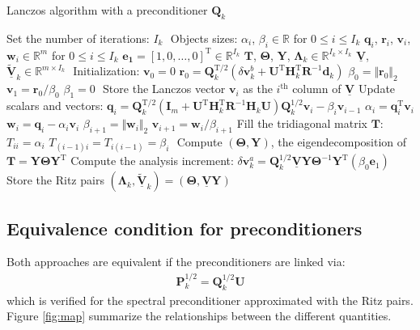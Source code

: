 \documentclass[12pt]{scrartcl}
\begin{document}
\begin{algorithm}[!ht]
\caption{Lanczos algorithm with a preconditioner $\mathbf{Q}_k$\label{algo:lanczos}}
\begin{algorithmic}
\STATE Set the number of iterations: $I_k$
\STATE $  $
\STATE Objects sizes:
\STATE $\alpha_i$, $\beta_i \in \mathbb{R}$ for $0 \le i \le I_k$
\STATE $\mathbf{q}_i$, $\mathbf{r}_i$, $\mathbf{v}_i$, $\mathbf{w}_i \in \mathbb{R}^m$ for $0 \le i \le I_k$
\STATE $\mathbf{e_1} = [1,0,\dots,0]^\mathrm{T} \in \mathbb{R}^{I_k}$
\STATE $\mathbf{T}$, $\boldsymbol{\Theta}$, $\mathbf{Y}$, $\boldsymbol{\Lambda}_k \in \mathbb{R}^{I_k \times I_k}$
\STATE $\underline{\mathbf{V}}$, $\underline{\widetilde{\mathbf{V}}}_k \in \mathbb{R}^{m \times I_k}$
\STATE $  $
\STATE Initialization:
\STATE $\mathbf{v}_0 = 0$
\STATE $\mathbf{r}_0 = \mathbf{Q}^{\mathrm{T}/2}_k \left(\delta \mathbf{v}^b_k + \mathbf{U}^\mathrm{T} \mathbf{H}_k^\mathrm{T} \mathbf{R}^{-1} \mathbf{d}_k\right)$
\STATE $\beta_0 = \Vert \mathbf{r}_0\Vert_2$
\STATE $\mathbf{v}_1 = \mathbf{r}_0/\beta_0$
\STATE $\beta_1 = 0$
\STATE $  $
\STATE Store the Lanczos vector $\mathbf{v}_i$ as the $i^\text{th}$ column of $\underline{\mathbf{V}}$
\STATE Update scalars and vectors:
\STATE $\mathbf{q}_i = \mathbf{Q}^{\mathrm{T}/2}_k \left(\mathbf{I}_m + \mathbf{U}^\mathrm{T} \mathbf{H}_k^\mathrm{T} \mathbf{R}^{-1} \mathbf{H}_k \mathbf{U}\right) \mathbf{Q}^{1/2}_k \mathbf{v}_i- \beta_i \mathbf{v}_{i-1}$ 
\STATE $\alpha_i = \mathbf{q}_i^\mathrm{T} \mathbf{v}_i$
\STATE $\mathbf{w}_i = \mathbf{q}_i - \alpha_i \mathbf{v}_i$
\STATE $\beta_{i+1} = \Vert \mathbf{w}_i\Vert_2$
\STATE $\mathbf{v}_{i+1} = \mathbf{w}_i/\beta_{i+1}$
\STATE Fill the tridiagonal matrix $\mathbf{T}$:
\STATE $T_{ii} = \alpha_i$
\STATE $T_{(i-1)i} = T_{i(i-1)} = \beta_i$
\ENDIF
\ENDFOR
\STATE $  $
\STATE Compute $\left(\boldsymbol{\Theta},\mathbf{Y}\right)$, the eigendecomposition of $\mathbf{T} = \mathbf{Y} \boldsymbol{\Theta} \mathbf{Y}^\mathrm{T}$
\STATE Compute the analysis increment: $\delta \mathbf{v}^a_k = \mathbf{Q}^{1/2}_k \underline{\mathbf{V}} \mathbf{Y} \boldsymbol{\Theta}^{-1} \mathbf{Y}^\mathrm{T} \left(\beta_0 \mathbf{e}_1\right)$
\STATE Store the Ritz pairs $\left(\boldsymbol{\Lambda}_k,\underline{\widetilde{\mathbf{V}}}_k \right) = \left(\boldsymbol{\Theta},\underline{\mathbf{V}} \mathbf{Y}\right)$
\end{algorithmic}
\end{algorithm}

\FloatBarrier

\subsection{Equivalence condition for preconditioners}
Both approaches are equivalent if the preconditioners are linked via:
\begin{align}
\label{eq:eq_cond_1}
\mathbf{P}^{1/2}_k = \mathbf{Q}^{1/2}_k \mathbf{U}
\end{align}
which is verified for the spectral preconditioner approximated with the Ritz pairs. Figure \ref{fig:map} summarize the relationships between the different quantities.
\end{document}
